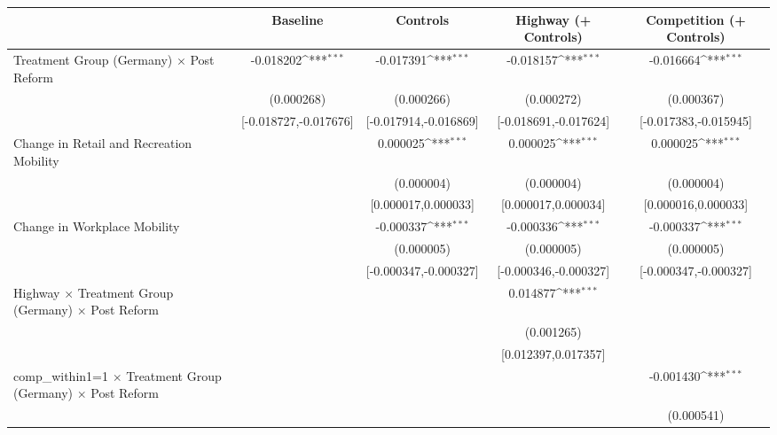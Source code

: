 {
\def\sym#1{\ifmmode^{#1}\else\(^{#1}\)\fi}
\begin{tabular}{l*{4}{c}}
\toprule
                    &\multicolumn{1}{c}{Baseline}&\multicolumn{1}{c}{Controls}&\multicolumn{1}{c}{Highway (+ Controls)}&\multicolumn{1}{c}{Competition (+ Controls)}\\
\midrule
Treatment Group (Germany) $\times$ Post Reform&   -0.018202\sym{***}&   -0.017391\sym{***}&   -0.018157\sym{***}&   -0.016664\sym{***}\\
                    &  (0.000268)         &  (0.000266)         &  (0.000272)         &  (0.000367)         \\
                    &[-0.018727,-0.017676]         &[-0.017914,-0.016869]         &[-0.018691,-0.017624]         &[-0.017383,-0.015945]         \\
Change in Retail and Recreation Mobility&                     &    0.000025\sym{***}&    0.000025\sym{***}&    0.000025\sym{***}\\
                    &                     &  (0.000004)         &  (0.000004)         &  (0.000004)         \\
                    &                     &[0.000017,0.000033]         &[0.000017,0.000034]         &[0.000016,0.000033]         \\
Change in Workplace Mobility&                     &   -0.000337\sym{***}&   -0.000336\sym{***}&   -0.000337\sym{***}\\
                    &                     &  (0.000005)         &  (0.000005)         &  (0.000005)         \\
                    &                     &[-0.000347,-0.000327]         &[-0.000346,-0.000327]         &[-0.000347,-0.000327]         \\
Highway $\times$ Treatment Group (Germany) $\times$ Post Reform&                     &                     &    0.014877\sym{***}&                     \\
                    &                     &                     &  (0.001265)         &                     \\
                    &                     &                     &[0.012397,0.017357]         &                     \\
comp\_within1=1 $\times$ Treatment Group (Germany) $\times$ Post Reform&                     &                     &                     &   -0.001430\sym{***}\\
                    &                     &                     &                     &  (0.000541)         \\

\end{tabular}}

